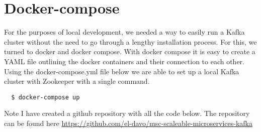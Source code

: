 \section{Docker-compose}

For the purposes of local development, we needed a way to easily run a Kafka cluster without the need to go through a lengthy installation process. For this, we turned to docker and docker compose. With docker compose it is easy to create a YAML file outlining the docker containers and their connection to each other. Using the docker-compose.yml file below we are able to set up a local Kafka cluster with Zookeeper with a single command.

\begin{verbatim}
  $ docker-compose up
\end{verbatim}

Note I have created a github repository with all the code below. The repository can be found here \href{https://github.com/el-davo/msc-scaleable-microservices-kafka}{https://github.com/el-davo/msc-scaleable-microservices-kafka}

